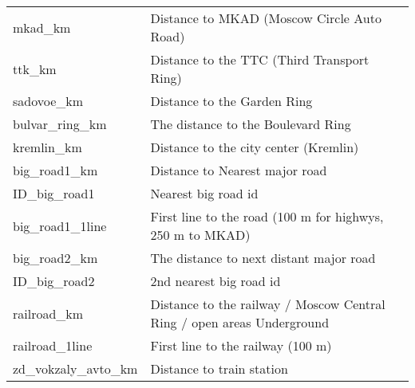 \begin{longtable}[c]{ll}
    mkad\_km                                   & Distance to MKAD (Moscow Circle Auto Road)                                                                                \\
    ttk\_km                                    & Distance to the TTC (Third Transport Ring)                                                                                \\
    sadovoe\_km                                & Distance to the Garden Ring                                                                                               \\
    bulvar\_ring\_km                           & The distance to the Boulevard Ring                                                                                        \\
    kremlin\_km                                & Distance to the city center (Kremlin)                                                                                     \\
    big\_road1\_km                             & Distance to Nearest major road                                                                                            \\
    ID\_big\_road1                             & Nearest big road id                                                                                                       \\
    big\_road1\_1line                          & First line to the road (100 m for highwys, 250 m to MKAD)                                                                 \\
    big\_road2\_km                             & The distance to next distant major road                                                                                   \\
    ID\_big\_road2                             & 2nd nearest big road id                                                                                                   \\
    railroad\_km                               & Distance to the railway / Moscow Central Ring / open areas Underground                                                    \\
    railroad\_1line                            & First line to the railway (100 m)                                                                                         \\
    zd\_vokzaly\_avto\_km                      & Distance to train station                                                                                                 \\

\end{longtable}
